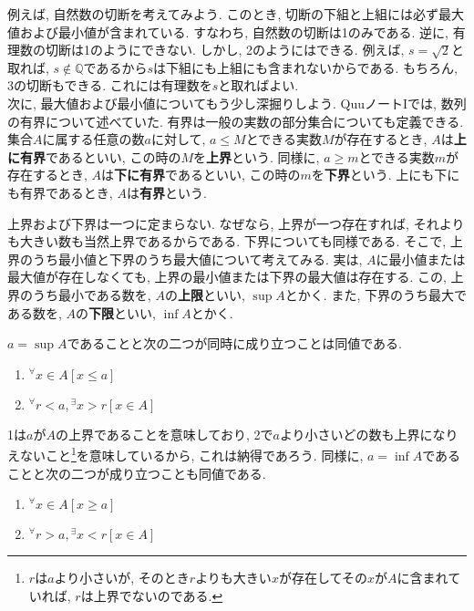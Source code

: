         例えば, 自然数の切断を考えてみよう. このとき, 切断の下組と上組には必ず最大値および最小値が含まれている. すなわち, 自然数の切断は1のみである.
        逆に, 有理数の切断は1のようにできない. しかし, 2のようにはできる. 例えば, $s=\sqrt{2}$と取れば, $s\not\in \mathbb{Q}$であるから$s$は下組にも上組にも含まれないからである.
        もちろん, 3の切断もできる. これには有理数を$s$と取ればよい.\\

        次に, 最大値および最小値についてもう少し深掘りしよう. QuuノートIでは, 数列の有界について述べていた. 有界は一般の実数の部分集合についても定義できる.
        集合$A$に属する任意の数$a$に対して, $a\leq M$とできる実数$M$が存在するとき, $A$は\textbf{上に有界}であるといい, この時の$M$を\textbf{上界}という.
        同様に, $a\geq m$とできる実数$m$が存在するとき, $A$は\textbf{下に有界}であるといい, この時の$m$を\textbf{下界}という.
        上にも下にも有界であるとき, $A$は\textbf{有界}という.

        上界および下界は一つに定まらない. なぜなら, 上界が一つ存在すれば, それよりも大きい数も当然上界であるからである. 下界についても同様である.
        そこで, 上界のうち最小値と下界のうち最大値について考えてみる. 実は, $A$に最小値または最大値が存在しなくても, 上界の最小値または下界の最大値は存在する.
        この, 上界のうち最小である数を, $A$の\textbf{上限}といい, $\sup A$とかく. また, 下界のうち最大である数を, $A$の\textbf{下限}といい, $\inf A$とかく.

        $a=\sup A$であることと次の二つが同時に成り立つことは同値である.
        \begin{enumerate}
            \item $^\forall x\in A \left[x\leq a\right]$
            \item $^\forall r<a,{}^\exists x> r\left[x\in A\right]$
        \end{enumerate}
        1は$a$が$A$の上界であることを意味しており, 2で$a$より小さいどの数も上界になりえないこと\footnote{$r$は$a$より小さいが, そのとき$r$よりも大きい$x$が存在してその$x$が$A$に含まれていれば, $r$は上界でないのである.}を意味しているから, これは納得であろう.
        同様に, $a=\inf A$であることと次の二つが成り立つことも同値である.
        \begin{enumerate}
            \item $^\forall x\in A \left[x\geq a\right]$
            \item $^\forall r>a,{}^\exists x< r\left[x\in A\right]$
        \end{enumerate}

